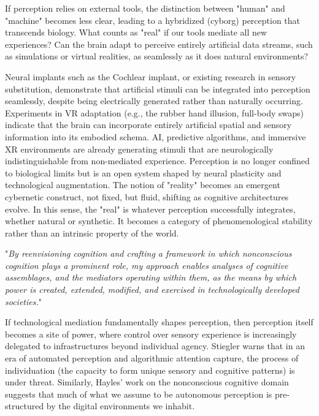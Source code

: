 If perception relies on external tools, the distinction between "human" and "machine" becomes less clear, leading to a hybridized (cyborg) perception that transcends biology. What counts as "real" if our tools mediate all new experiences? Can the brain adapt to perceive entirely artificial data streams, such as simulations or virtual realities, as seamlessly as it does natural environments?  

Neural implants such as the Cochlear implant, or existing research in sensory substitution, demonstrate that artificial stimuli can be integrated into perception seamlessly, despite being electrically generated rather than naturally occurring. Experiments in VR adaptation (e.g., the rubber hand illusion, full-body swaps) indicate that the brain can incorporate entirely artificial spatial and sensory information into its embodied schema. AI, predictive algorithms, and immersive XR environments are already generating stimuli that are neurologically indistinguishable from non-mediated experience. Perception is no longer confined to biological limits but is an open system shaped by neural plasticity and technological augmentation. The notion of "reality" becomes an emergent cybernetic construct, not fixed, but fluid, shifting as cognitive architectures evolve. In this sense, the "real" is whatever perception successfully integrates, whether natural or synthetic. It becomes a category of phenomenological stability rather than an intrinsic property of the world. 

"\textit{By reenvisioning cognition and crafting a framework in which nonconscious cognition plays a prominent role, my approach enables analyses of cognitive assemblages, and the mediators operating within them, as the means by which power is created, extended, modified, and exercised in technologically developed societies.}"\citep{hayles2017}

If technological mediation fundamentally shapes perception, then perception itself becomes a site of power, where control over sensory experience is increasingly delegated to infrastructures beyond individual agency. Stiegler warns that in an era of automated perception and algorithmic attention capture, the process of individuation (the capacity to form unique sensory and cognitive patterns) is under threat. Similarly, Hayles' work on the nonconscious cognitive domain suggests that much of what we assume to be autonomous perception is pre-structured by the digital environments we inhabit. 

